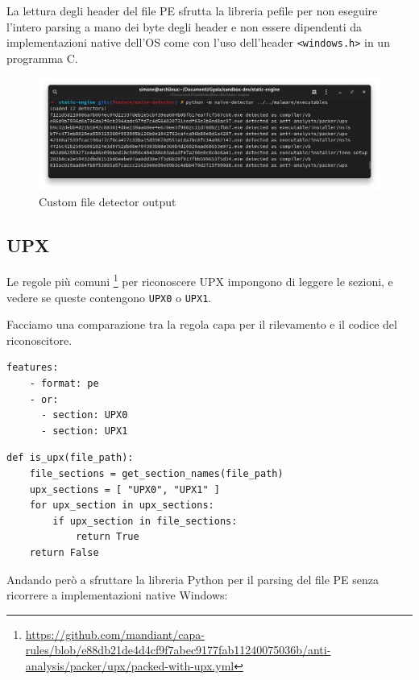 La lettura degli header del file PE sfrutta la libreria pefile per non eseguire l'intero parsing a mano dei byte degli header e non essere dipendenti da implementazioni native dell'OS come con l'uso dell'header \texttt{<windows.h>} in un programma C.

\begin{figure}[ht]
    \centering
    \includegraphics[width=\textwidth]{assets/custom_file_detector_output.png}
    \caption{Custom file detector output}
\end{figure}

\subsection{UPX}
Le regole più comuni
\footnote{\url{https://github.com/mandiant/capa-rules/blob/e88db21de4d4cf9f7abec9177fab11240075036b/anti-analysis/packer/upx/packed-with-upx.yml}}
per riconoscere UPX impongono di leggere le sezioni, e vedere se queste contengono \texttt{UPX0} o \texttt{UPX1}.

Facciamo una comparazione tra la regola capa per il rilevamento e il codice del riconoscitore.

\noindent\begin{minipage}{.35\textwidth}
       \begin{verbatim}
features:
    - format: pe
    - or:
      - section: UPX0
      - section: UPX1
       \end{verbatim}
\end{minipage}
\begin{minipage}{.4\textwidth}
       \begin{verbatim}
def is_upx(file_path):
    file_sections = get_section_names(file_path)
    upx_sections = [ "UPX0", "UPX1" ]
    for upx_section in upx_sections:
        if upx_section in file_sections:
            return True
    return False
       \end{verbatim}
\end{minipage}

\bigskip

Andando però a sfruttare la libreria Python per il parsing del file PE senza ricorrere a implementazioni native Windows:

